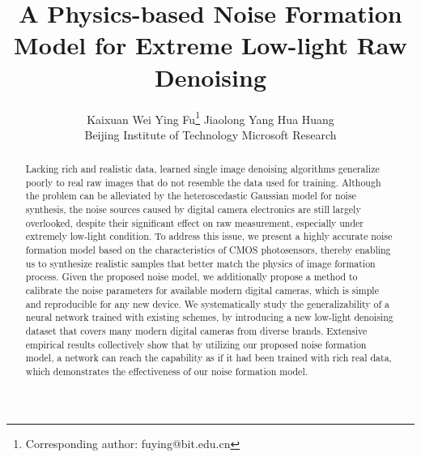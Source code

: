 \documentclass[10pt,twocolumn,letterpaper]{article}
\begin{document}
\title{A Physics-based Noise Formation Model for Extreme Low-light Raw Denoising}

\author{Kaixuan Wei  \quad Ying Fu\footnote{Corresponding author: fuying@bit.edu.cn} \quad Jiaolong Yang  \quad Hua Huang
\\ Beijing Institute of Technology \quad Microsoft  Research\\
}

\maketitle

\begin{abstract}
  Lacking rich and realistic data, learned single image denoising algorithms
  generalize poorly to real raw images that do not resemble the data used for
  training. Although the problem can be alleviated by the
  heteroscedastic Gaussian model for noise synthesis, the noise sources caused by digital
  camera electronics are still largely overlooked, despite their significant effect on
  raw measurement, especially under extremely low-light condition. To address
  this issue, we present a highly accurate noise formation model based on the
  characteristics of CMOS photosensors, thereby enabling us to synthesize
  realistic samples that better match the physics of image formation process.
  Given the proposed noise model, we additionally propose a
  method to calibrate the noise parameters for available modern digital
  cameras, which is simple and reproducible for any new device. We
  systematically study the generalizability of a neural network trained with
  existing schemes, by introducing a new low-light denoising dataset that covers
  many modern digital cameras from diverse brands. Extensive empirical results
  collectively show that by utilizing our proposed noise formation model, a
  network can reach the capability as if it had been trained with rich real
  data, which demonstrates the effectiveness of our noise formation model.
\end{abstract}
\end{document}
